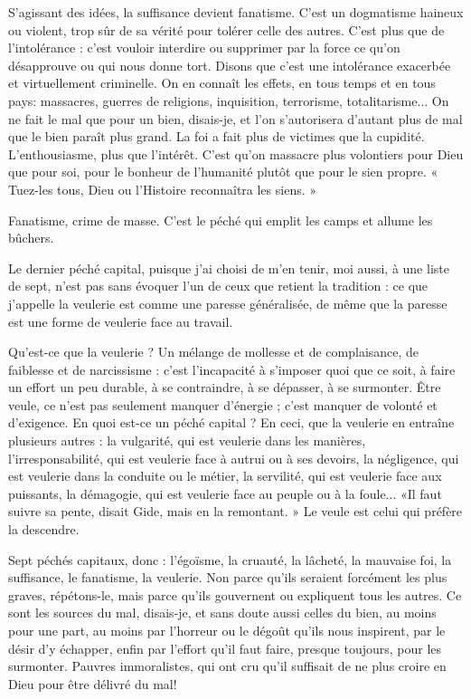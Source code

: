 S'agissant des idées, la suffisance devient fanatisme. C’est un dogmatisme
haineux ou violent, trop sûr de sa vérité pour tolérer celle des autres. C’est plus
que de l'intolérance : c’est vouloir interdire ou supprimer par la force ce qu’on
désapprouve ou qui nous donne tort. Disons que c’est une intolérance exacerbée
et virtuellement criminelle. On en connaît les effets, en tous temps et en
tous pays: massacres, guerres de religions, inquisition, terrorisme, totalitarisme...
On ne fait le mal que pour un bien, disais-je, et l’on s’autorisera
d’autant plus de mal que le bien paraît plus grand. La foi a fait plus de victimes
que la cupidité. L’enthousiasme, plus que l'intérêt. C’est qu’on massacre plus
volontiers pour Dieu que pour soi, pour le bonheur de l'humanité plutôt que
pour le sien propre. « Tuez-les tous, Dieu ou l'Histoire reconnaîtra les siens. »

Fanatisme, crime de masse. C’est le péché qui emplit les camps et allume les
bûchers.

Le dernier péché capital, puisque j'ai choisi de m’en tenir, moi aussi, à une
liste de sept, n’est pas sans évoquer l’un de ceux que retient la tradition : ce que
j'appelle la veulerie est comme une paresse généralisée, de même que la paresse
est une forme de veulerie face au travail.

Qu'est-ce que la veulerie ? Un mélange de mollesse et de complaisance, de
faiblesse et de narcissisme : c’est l'incapacité à s’imposer quoi que ce soit, à faire
un effort un peu durable, à se contraindre, à se dépasser, à se surmonter. Être
veule, ce n’est pas seulement manquer d'énergie ; c’est manquer de volonté et
d’exigence. En quoi est-ce un péché capital ? En ceci, que la veulerie en entraîne
plusieurs autres : la vulgarité, qui est veulerie dans les manières, l’irresponsabilité,
qui est veulerie face à autrui ou à ses devoirs, la négligence, qui est veulerie dans
la conduite ou le métier, la servilité, qui est veulerie face aux puissants, la démagogie,
qui est veulerie face au peuple ou à la foule... «Il faut suivre sa pente,
disait Gide, mais en la remontant. » Le veule est celui qui préfère la descendre.

Sept péchés capitaux, donc : l’égoïsme, la cruauté, la lâcheté, la mauvaise
foi, la suffisance, le fanatisme, la veulerie. Non parce qu’ils seraient forcément
les plus graves, répétons-le, mais parce qu’ils gouvernent ou expliquent tous les
autres. Ce sont les sources du mal, disais-je, et sans doute aussi celles du bien,
au moins pour une part, au moins par l’horreur ou le dégoût qu’ils nous inspirent,
par le désir d’y échapper, enfin par l'effort qu’il faut faire, presque toujours,
pour les surmonter. Pauvres immoralistes, qui ont cru qu’il suffisait de
ne plus croire en Dieu pour être délivré du mal!

